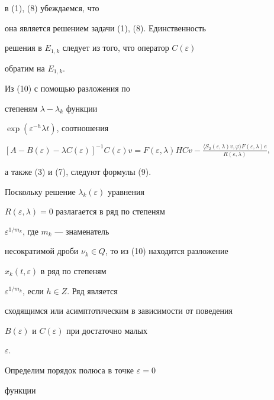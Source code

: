 в (1), (8) убеждаемся, что


она является решением задачи (1), (8). Единственность


решения в $E_{1,k}$ следует из того, что оператор $C(\varepsilon)$


обратим на $E_{1,k}$.


Из (10) с помощью разложения по


степеням $\lambda - \lambda_k$ функции


$\exp(\varepsilon^{-h}\lambda t)$, соотношения


$[A-B(\varepsilon)-\lambda C(


\varepsilon)]^{-1}C(\varepsilon)v=F(\varepsilon,\lambda)HCv-


\frac{\langle S_2(


\varepsilon,\lambda)v,\varphi\rangle F(\varepsilon,\lambda)e}


{R(\varepsilon,\lambda)}$,


а также (3) и (7), следуют формулы (9).





Поскольку решение $\lambda_k(\varepsilon)$ уравнения


$R(\varepsilon,\lambda)=0$ разлагается в ряд по степеням


$\varepsilon^{1/m_k}$, где $m_k$ --- знаменатель


несократимой дроби $\nu_k\in Q$, то из (10) находится разложение


$x_k(t,\varepsilon)$ в ряд по степеням


$\varepsilon^{1/m_k}$, если $h\in Z$. Ряд является


сходящимся или асимптотическим в зависимости от поведения


$B(\varepsilon)$ и $C(\varepsilon)$ при достаточно малых


$\varepsilon$.





Определим порядок полюса в точке $\varepsilon=0$


функции


